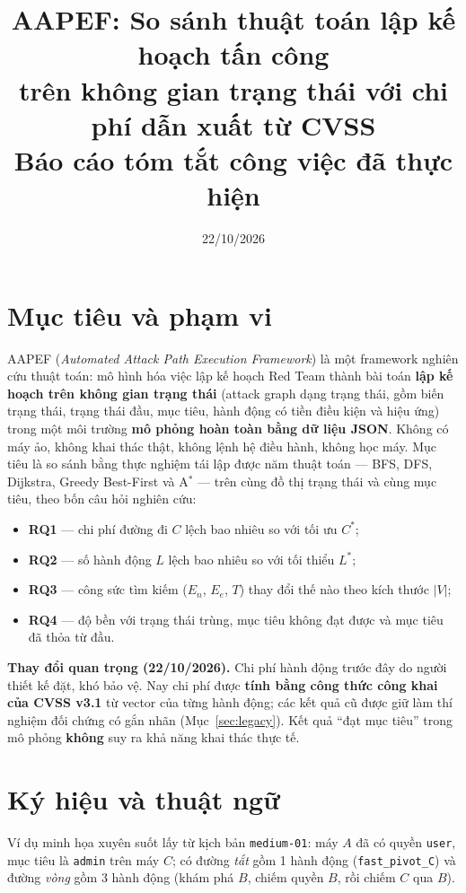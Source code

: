 \documentclass[11pt,a4paper]{article}
\title{\textbf{AAPEF: So sánh thuật toán lập kế hoạch tấn công\\ trên không gian trạng thái với chi phí dẫn xuất từ CVSS}\\[2pt]
\large Báo cáo tóm tắt công việc đã thực hiện}
\author{}
\date{22/10/2026}
\newcommand{\Cs}{C^{*}}
\newcommand{\Ls}{L^{*}}
\newcommand{\V}{|V|}
\newcommand{\En}{E_{n}}
\begin{document}
\maketitle
\vspace{-1.2cm}

\section{Mục tiêu và phạm vi}

AAPEF (\emph{Automated Attack Path Execution Framework}) là một framework nghiên cứu thuật toán: mô hình hóa việc lập kế hoạch Red Team thành bài toán \textbf{lập kế hoạch trên không gian trạng thái} (attack graph dạng trạng thái, gồm biến trạng thái, trạng thái đầu, mục tiêu, hành động có tiền điều kiện và hiệu ứng) trong một môi trường \textbf{mô phỏng hoàn toàn bằng dữ liệu JSON}. Không có máy ảo, không khai thác thật, không lệnh hệ điều hành, không học máy. Mục tiêu là so sánh bằng thực nghiệm tái lập được năm thuật toán --- BFS, DFS, Dijkstra, Greedy Best-First và A$^{*}$ --- trên cùng đồ thị trạng thái và cùng mục tiêu, theo bốn câu hỏi nghiên cứu:

\begin{itemize}
  \item \textbf{RQ1} --- chi phí đường đi $C$ lệch bao nhiêu so với tối ưu $\Cs$;
  \item \textbf{RQ2} --- số hành động $L$ lệch bao nhiêu so với tối thiểu $\Ls$;
  \item \textbf{RQ3} --- công sức tìm kiếm ($\En$, $E_e$, $T$) thay đổi thế nào theo kích thước $\V$;
  \item \textbf{RQ4} --- độ bền với trạng thái trùng, mục tiêu không đạt được và mục tiêu đã thỏa từ đầu.
\end{itemize}

\textbf{Thay đổi quan trọng (22/10/2026).} Chi phí hành động trước đây do người thiết kế đặt, khó bảo vệ. Nay chi phí được \textbf{tính bằng công thức công khai của CVSS v3.1} từ vector của từng hành động; các kết quả cũ được giữ làm thí nghiệm đối chứng có gắn nhãn (Mục~\ref{sec:legacy}). Kết quả ``đạt mục tiêu'' trong mô phỏng \textbf{không} suy ra khả năng khai thác thực tế.

\section{Ký hiệu và thuật ngữ}
\label{sec:glossary}

Ví dụ minh họa xuyên suốt lấy từ kịch bản \texttt{medium-01}: máy $A$ đã có quyền \texttt{user}, mục tiêu là \texttt{admin} trên máy $C$; có đường \emph{tắt} gồm 1 hành động (\texttt{fast\_pivot\_C}) và đường \emph{vòng} gồm 3 hành động (khám phá $B$, chiếm quyền $B$, rồi chiếm $C$ qua $B$).
\end{document}

